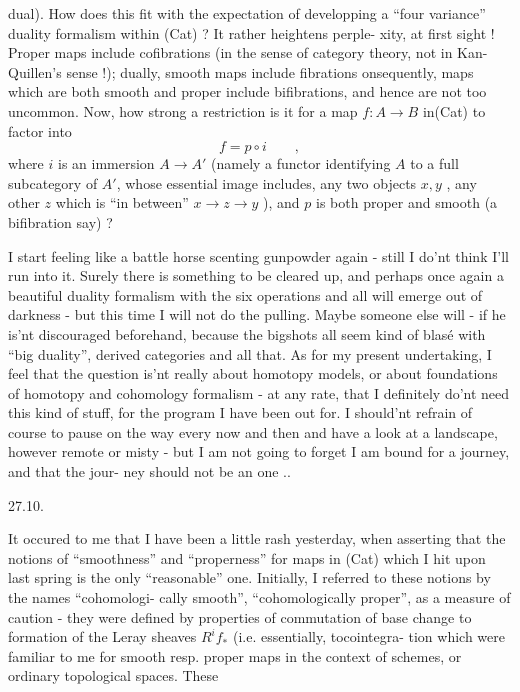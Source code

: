 
dual). How does this fit with the expectation of developping a ``four
variance'' duality formalism within (Cat) ? It rather heightens perple-%
xity, at first sight ! Proper maps include cofibrations (in the sense
of category theory, not in  Kan-Quillen's sense !); dually, smooth
maps include fibrations onsequently, maps which are both smooth and
proper include bifibrations, and hence are not too uncommon. Now, how
strong a restriction is it for a map $f\colon A\longrightarrow B$ in(\unsure{\hand{(}}Cat) to factor into
\[ f = p\circ i \qquad , \]
where $i$ is an immersion $A\longrightarrow A'$ (namely a functor identifying $A$ to
a full subcategory of $A'$, whose essential image includes,  any
two objects $x,y$ , any other $z$ which is ``in between'' $x\to z\to y$ ),
and $p$ is both proper and smooth (a bifibration say) ?

I  start feeling like a  battle horse scenting
gunpowder again - still I do'nt think I'll run into it. Surely there
is something to be cleared up, and perhaps once again a beautiful
duality formalism with the six operations and all will emerge out of
darkness - but this time I will not do the pulling. Maybe someone
else will - if he is'nt discouraged beforehand, because the bigshots
all seem kind of blasé with  ``big duality'', derived categories
and all that. As for my present undertaking, I feel that the question
is'nt really  about homotopy models, or about foundations
of homotopy and cohomology formalism - at any rate, that I definitely
do'nt need this kind of stuff, for the program I have been out for.
I should'nt refrain of course to pause on the way every now and then
and have a look at a landscape, however remote  or misty - but
I am not going to forget I am bound for a journey, and that the jour-%
ney should not be an  one \xout{!}..

27.10.

  It occured to me that I have been a little rash yesterday,
when asserting that the notions of ``smoothness'' and ``properness'' for
maps in (Cat) which I hit upon last spring is the only ``reasonable''
one. Initially, I referred to these notions by the names ``cohomologi-%
cally smooth'', ``cohomologically proper'', as a measure of caution -
they were defined by properties of commutation of base change to
formation of the Leray sheaves $R^if_*$ (i.e. essentially, tocointegra-%
tion\hand{),} which were familiar to me for smooth resp. proper maps in the
context of schemes, or ordinary topological spaces.  These

